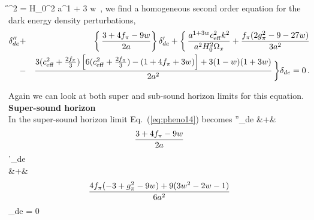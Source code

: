 \be 
\H^2 = H_0^2  {a^{1 + 3 w}}\, ,
\ee 
we find a homogeneous second order equation for the dark energy density perturbations,
\begin{eqnarray}
\label{eq:pheno14}
\delta''_{de} &+&  \bigg\{\,  \frac{3 + 4 f_\pi - 9 w}{2 a}  \bigg\}\,   \delta'_{de}
+  \bigg\{\, \frac{a^{1 + 3 w} c_{\rm eff}^2 k^2}{a^2 H_0^2 \Omega_x}  + \frac{f_\pi ( 2 g_\pi^2 - 9 - 27 w ) }{3a^2}
 \\ \nonumber
 &-& \frac{3 ( c_{\rm eff}^2 + \frac{2 f_\pi}{3} ) \left[6 ( c_{\rm eff}^2 + \frac{2 f_\pi}{3})  -  (1 + 4 f_\pi + 3 w) \right] + 3 (1 - w)(1 + 3 w) }{2 a^2}  \,\bigg\}
 \delta_{de} = 0 \, .
\end{eqnarray} 

Again we can look at both super and sub-sound horizon limits for this equation. \\

\noindent\textbf{Super-sound horizon}\\

In the super-sound horizon limit Eq.\ (\ref{eq:pheno14}) becomes
\be 
\delta''_{de} &+&  \[ \frac{3 + 4 \ff - 9 w}{2 a}  \] \delta'_{de}   \nonumber \\
&+& \[  \frac{4 f_\pi (-3 + g_\pi^2 - 9 w) + 9 ( 3 w^2 - 2 w - 1 )  }{6 a^2}  \] \delta_{de} = 0 
\label{eq:pheno15}
\ee

